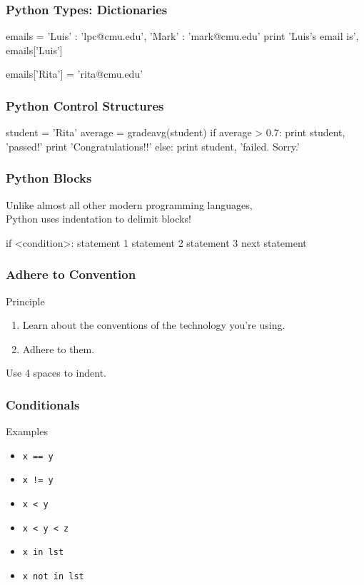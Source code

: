 \begin{frame}[fragile]
\frametitle{Python Types: Dictionaries}
\begin{python}
emails = { 'Luis' : 'lpc@cmu.edu',
           'Mark' : 'mark@cmu.edu' }
print 'Luis's email is', emails['Luis']

emails['Rita'] = 'rita@cmu.edu'
\end{python}

\end{frame}

\begin{frame}[fragile]
\frametitle{Python Control Structures}

\begin{python}
student = 'Rita'
average = gradeavg(student)
if average > 0.7:
    print student, 'passed!'
    print 'Congratulations!!'
else:
    print student, 'failed. Sorry.'
\end{python}
\end{frame}

\begin{frame}[fragile]
\frametitle{Python Blocks}

Unlike almost all other modern programming languages,\\
Python uses \alert{indentation} to delimit blocks!

\begin{python}
if <condition>:
    statement 1
    statement 2
    statement 3
next statement
\end{python}

\end{frame}

\begin{frame}[fragile]
\frametitle{Adhere to Convention}
\begin{block}{Principle}
\begin{enumerate}
\item Learn about the conventions of the technology you're using.
\item Adhere to them.
\end{enumerate}
\end{block}

Use 4 spaces to indent.
\end{frame}

\begin{frame}[fragile]
\frametitle{Conditionals}


\begin{block}{Examples}
\begin{itemize}
\item \lstinline{x == y}
\item \lstinline{x != y}
\item \lstinline{x < y}
\item \lstinline{x < y < z}
\item \lstinline{x in lst}
\item \lstinline{x not in lst}
\end{itemize}
\end{block}

\end{frame}

